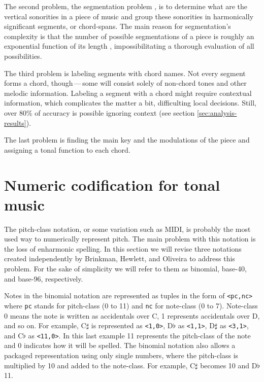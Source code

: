 \documentclass{article}
\begin{document}
The second problem, the segmentation problem
\cite{pardo.ea:automated}, is to determine what are the vertical
sonorities in a piece of music and group these sonorities in
harmonically significant segments, or chord-spans. The main reason for
segmentation's complexity is that the number of possible segmentations
of a piece is roughly an exponential function of its length
\cite{pardo.ea:algorithms}, impossibilitating a thorough evaluation of
all possibilities.

The third problem is labeling segments with chord names. Not every
segment forms a chord, though\,---\,some will consist solely of non-chord
tones and other melodic information. Labeling a segment with a chord might
require contextual information, which complicates the matter a bit,
difficulting local decisions. Still, over 80\% of accuracy is possible
ignoring context (see section \ref{sec:analysis-results}).

The last problem is finding the main key and the modulations of the
piece and assigning a tonal function to each chord.

\section{Numeric codification for tonal music}
\label{sec:codificacao-jamary}

The pitch-class notation, or some variation such as MIDI, is probably
the most used way to numerically represent pitch. The main problem
with this notation is the loss of enharmonic spelling. In this section
we will revise three notations created independently by Brinkman,
Hewlett, and Oliveira \cite{brinkman:binomial, hewlett:base-40,
  oliveira:busca} to address this problem. For the sake of simplicity
we will refer to them as binomial, base-40, and base-96, respectively.

Notes in the binomial notation are represented as tuples in the form
of \texttt{<pc,nc>} where \texttt{pc} stands for pitch-class (0 to 11)
and \texttt{nc} for note-class (0 to 7). Note-class 0 means the note
is written as accidentals over C, 1 represents accidentals over D, and
so on. For example, C$\sharp$ is represented as \texttt{<1,0>},
D$\flat$ as \texttt{<1,1>}, D$\sharp$ as \texttt{<3,1>}, and C$\flat$
as \texttt{<11,0>}. In this last example 11 represents the pitch-class
of the note and 0 indicates how it will be spelled. The binomial
notation also allows a packaged representation using only single
numbers, where the pitch-class is multiplied by 10 and added to the
note-class. For example, C$\sharp$ becomes 10 and D$\flat$
11.
\end{document}
